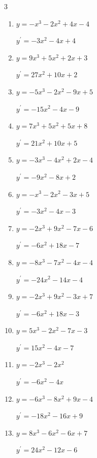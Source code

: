 \begin{multicols}{3}
\begin{enumerate}
  \item $y=-x^{3}-2x^{2}+4x-4$

        $\displaystyle y^{\prime}=-3x^{2}-4x+4$

  \item $y=9x^{3}+5x^{2}+2x+3$

        $\displaystyle y^{\prime}=27x^{2}+10x+2$

  \item $y=-5x^{3}-2x^{2}-9x+5$

        $\displaystyle y^{\prime}=-15x^{2}-4x-9$

  \item $y=7x^{3}+5x^{2}+5x+8$

        $\displaystyle y^{\prime}=21x^{2}+10x+5$

  \item $y=-3x^{3}-4x^{2}+2x-4$

        $\displaystyle y^{\prime}=-9x^{2}-8x+2$

  \item $y=-x^{3}-2x^{2}-3x+5$

        $\displaystyle y^{\prime}=-3x^{2}-4x-3$

  \item $y=-2x^{3}+9x^{2}-7x-6$

        $\displaystyle y^{\prime}=-6x^{2}+18x-7$

  \item $y=-8x^{3}-7x^{2}-4x-4$

        $\displaystyle y^{\prime}=-24x^{2}-14x-4$

  \item $y=-2x^{3}+9x^{2}-3x+7$

        $\displaystyle y^{\prime}=-6x^{2}+18x-3$

  \item $y=5x^{3}-2x^{2}-7x-3$

        $\displaystyle y^{\prime}=15x^{2}-4x-7$

\columnbreak %

  \item $y=-2x^{3}-2x^{2}$

        $\displaystyle y^{\prime}=-6x^{2}-4x$

  \item $y=-6x^{3}-8x^{2}+9x-4$

        $\displaystyle y^{\prime}=-18x^{2}-16x+9$

  \item $y=8x^{3}-6x^{2}-6x+7$

        $\displaystyle y^{\prime}=24x^{2}-12x-6$


\end{enumerate}
\end{multicols}
